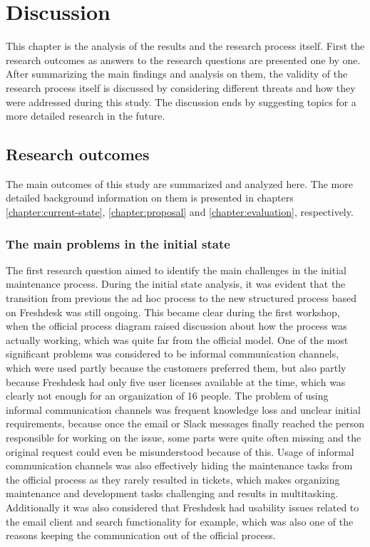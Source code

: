 \chapter{Discussion}
\label{chapter:discussion}

This chapter is the analysis of the results and the research process itself. First the research outcomes as answers to the research questions are presented one by one. After summarizing the main findings
and analysis on them, the validity of the research process itself is discussed by considering different threats and how they were addressed during this study. The discussion ends by suggesting
topics for a more detailed research in the future.

\section{Research outcomes}
\label{section:outcomes}

The main outcomes of this study are summarized and analyzed here. The more detailed background information on them is presented in
chapters \ref{chapter:current-state}, \ref{chapter:proposal} and \ref{chapter:evaluation}, respectively.

\subsection{The main problems in the initial state}

The first research question aimed to identify the main challenges in the initial maintenance process. During the initial state analysis, it was evident that the transition from previous the ad hoc process to
the new structured process based on Freshdesk was still ongoing. This became clear during the first workshop, when the official process diagram raised discussion about how the process was actually working, which
was quite far from the official model. One of the most significant problems was considered to be informal communication channels, which were used partly because the customers preferred them, but also partly
because Freshdesk had only five user licenses available at the time, which was clearly not enough for an organization of 16 people. The problem of using informal communication channels was frequent knowledge loss and unclear
initial requirements, because once the email or Slack messages finally reached the person responsible for working on the issue, some parts were quite often missing and the original request could even be
misunderstood because of this. Usage of informal communication channels was also effectively hiding the maintenance tasks from the official process as they rarely resulted in tickets, which makes
organizing maintenance and development tasks challenging and results in multitasking. Additionally it was also considered that Freshdesk had usability issues related to the email client and search functionality
for example, which was also one of the reasons keeping the communication out of the official process.

